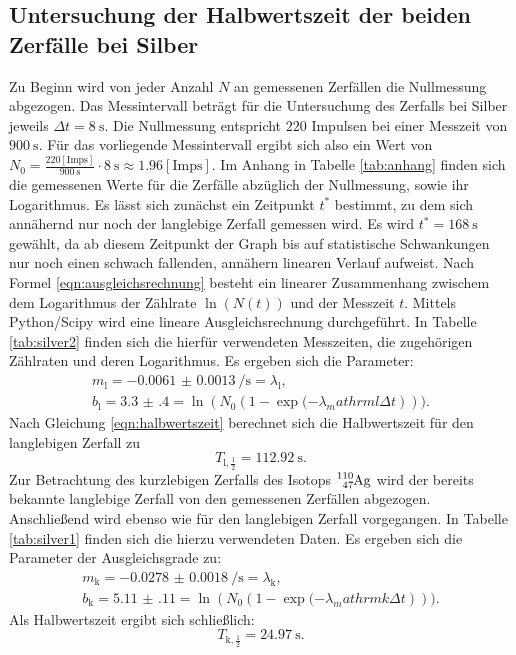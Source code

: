 \subsection{Untersuchung der Halbwertszeit der beiden Zerfälle bei Silber}
Zu Beginn wird von jeder Anzahl $N$ an gemessenen Zerfällen die Nullmessung abgezogen.
Das Messintervall beträgt für die Untersuchung des Zerfalls bei Silber jeweils $\Delta t = \SI{8}{\second}$.
Die Nullmessung entspricht $220$ Impulsen bei einer Messzeit von $\SI{900}{\second}$.
Für das vorliegende Messintervall ergibt sich also ein Wert von $N_0=\frac{220\mathrm{ [Imps]}}{\SI{900}{\second}}\cdot \SI{8}{\second}\approx 1.96\mathrm{ [Imps]}$.
Im Anhang in Tabelle \ref{tab:anhang} finden sich die gemessenen Werte für die Zerfälle abzüglich der Nullmessung, sowie ihr Logarithmus.
Es lässt sich zunächst ein Zeitpunkt $t^{*}$ bestimmt, zu dem sich annähernd nur noch der langlebige Zerfall gemessen wird.
Es wird $t^{*}=\SI{168}{\second}$ gewählt, da ab diesem Zeitpunkt der Graph bis auf statistische Schwankungen nur noch einen schwach fallenden, annähern linearen Verlauf aufweist.
Nach Formel \eqref{eqn:ausgleichsrechnung} besteht ein linearer Zusammenhang zwischem dem Logarithmus der Zählrate $\ln{(N(t))}$ und der Messzeit $t$.
Mittels Python/Scipy \cite{scipy} wird eine lineare Ausgleichsrechnung durchgeführt.
In Tabelle \ref{tab:silver2} finden sich die hierfür verwendeten Messzeiten, die zugehörigen Zählraten und deren Logarithmus.
Es ergeben sich die Parameter:
\begin{gather*}
	m_{\mathrm{l}}= \SI{-0.0061(13)}{\per\second}=\lambda_\mathrm{l}\text{,}\\
	b_{\mathrm{l}}=\num{3.3(4)}=\ln{(N_0 \left(1- \exp{(-\lambda_mathrm{l} \Delta t}\right)))}\text{.}
\end{gather*}
Nach Gleichung \eqref{eqn:halbwertszeit} berechnet sich die Halbwertszeit für den langlebigen Zerfall zu
\begin{equation}
	T_{\mathrm{l},\frac{1}{2}}=\SI{112.92}{\second}\text{.}
\end{equation}
Zur Betrachtung des kurzlebigen Zerfalls des Isotops $\ce{^{110}_47Ag}$ wird der bereits bekannte langlebige Zerfall von den gemessenen Zerfällen abgezogen.
Anschließend wird ebenso wie für den langlebigen Zerfall vorgegangen.
In Tabelle \ref{tab:silver1} finden sich die hierzu verwendeten Daten.
Es ergeben sich die Parameter der Ausgleichsgrade zu:
\begin{align*}
	m_{\mathrm{k}}= \SI{-0.0278(18)}{\per\second}=\lambda_\mathrm{k}\text{,}\\
	b_{\mathrm{k}}=\num{5.11(11)}=\ln{(N_0 \left(1- \exp{(-\lambda_mathrm{k} \Delta t}\right)))}\text{.}
\end{align*}
Als Halbwertszeit ergibt sich schließlich:
\begin{equation}
	T_{\mathrm{k},\frac{1}{2}}=\SI{24.97}{\second}\text{.}
\end{equation}

